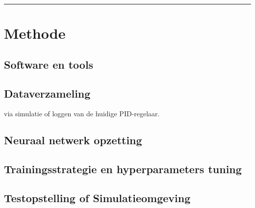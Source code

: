 \vspace{0.2cm}
{\color{gray}\hrule}
\section{Methode}



\subsection{Software en tools}

\subsection{Dataverzameling}
via simulatie of loggen van de huidige PID-regelaar.


\subsection{Neuraal netwerk opzetting}

\subsection{Trainingsstrategie en hyperparameters tuning}

\subsection{Testopstelling of Simulatieomgeving}









